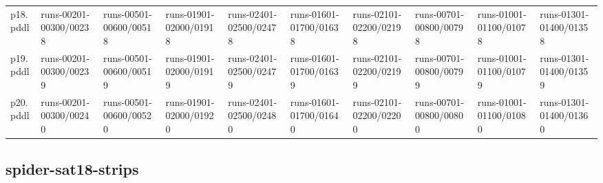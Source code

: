 \documentclass{article}
\begin{document}
\begin{tabular}{@{}lrrrrrrrrr@{}}
p18.pddl & \multicolumn{1}{|l|}{runs-00201-00300/00238} & \multicolumn{1}{|l|}{runs-00501-00600/00518} & \multicolumn{1}{|l|}{runs-01901-02000/01918} & \multicolumn{1}{|l|}{runs-02401-02500/02478} & \multicolumn{1}{|l|}{runs-01601-01700/01638} & \multicolumn{1}{|l|}{runs-02101-02200/02198} & \multicolumn{1}{|l|}{runs-00701-00800/00798} & \multicolumn{1}{|l|}{runs-01001-01100/01078} & \multicolumn{1}{|l|}{runs-01301-01400/01358} \\
p19.pddl & \multicolumn{1}{|l|}{runs-00201-00300/00239} & \multicolumn{1}{|l|}{runs-00501-00600/00519} & \multicolumn{1}{|l|}{runs-01901-02000/01919} & \multicolumn{1}{|l|}{runs-02401-02500/02479} & \multicolumn{1}{|l|}{runs-01601-01700/01639} & \multicolumn{1}{|l|}{runs-02101-02200/02199} & \multicolumn{1}{|l|}{runs-00701-00800/00799} & \multicolumn{1}{|l|}{runs-01001-01100/01079} & \multicolumn{1}{|l|}{runs-01301-01400/01359} \\
p20.pddl & \multicolumn{1}{|l|}{runs-00201-00300/00240} & \multicolumn{1}{|l|}{runs-00501-00600/00520} & \multicolumn{1}{|l|}{runs-01901-02000/01920} & \multicolumn{1}{|l|}{runs-02401-02500/02480} & \multicolumn{1}{|l|}{runs-01601-01700/01640} & \multicolumn{1}{|l|}{runs-02101-02200/02200} & \multicolumn{1}{|l|}{runs-00701-00800/00800} & \multicolumn{1}{|l|}{runs-01001-01100/01080} & \multicolumn{1}{|l|}{runs-01301-01400/01360} \\
\end{tabular}

\hypertarget{run_dir-spider-sat18-strips}{}
\subsection*{spider-sat18-strips}
\end{document}
